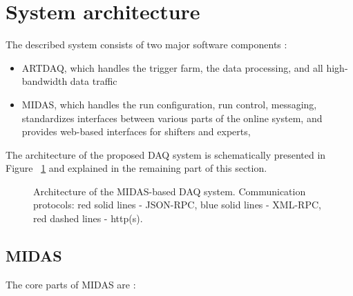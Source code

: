 \section{System architecture}

The described system consists of two major software components :
\begin{itemize}
\item
  ARTDAQ, which handles the trigger farm, the data processing,
  and all high-bandwidth data traffic
\item
  MIDAS, which handles the run configuration, run control, messaging,
  standardizes interfaces between various parts of the online system,
  and provides web-based interfaces for shifters and experts,
\end{itemize}

The architecture of the proposed DAQ system is schematically presented
in Figure ~\ref{figure:system_architecture} and explained in the remaining
part of this section.

\begin{figure}[H]
  \caption{
    \label{figure:system_architecture}
    Architecture of the MIDAS-based DAQ system. Communication protocols:
    red solid lines - JSON-RPC, blue solid lines - XML-RPC,
    red dashed lines - http(s).
  }
\end{figure}

\subsection{MIDAS}

The core parts of MIDAS are :

